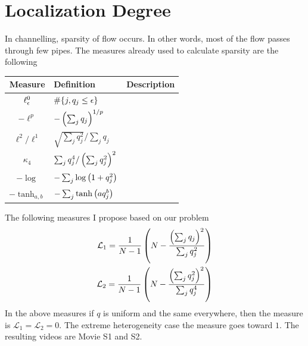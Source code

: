 \newpage

\section{Localization Degree}
%
In channelling, sparsity of flow occurs. In other words, most of the
flow passes through few pipes. The measures already used to calculate
sparsity are the following
%

\begin{center}
  \begin{tabular}{ |c|l|l| }
    \hline
  Measure & Definition & Description  \\ \hline
    $\ell^{0}_{\epsilon}$  & $\#\{j, q_j \leq \epsilon \}$ & \\ \hline
    $-\ell^p$ & $-\left( \sum_j q_j\right)^{1/p}$ & \\ \hline
    $\ell^2/\ell^1$ & $\sqrt{\sum_j q_j^2}/\sum_j q_j$ &\\ \hline
    $\kappa_4$ & $\sum_j q_j^4 / \left( \sum_{j} q^{2}_{j}\right)^2$ & \\ \hline
    $-\log$ & $-\sum_j \log \left( 1 + q_j^2\right) $ & \\ \hline
    $-\tanh_{a,b}$ & $-\sum_j \tanh \left( a q_j^b\right)$ & \\
\hline                               
\end{tabular}
\end{center}


The following measures I propose based on our problem
%
\begin{align}
  \mathcal{L}_1 = \frac{1}{N - 1} \left( N - \frac{\left( \sum_{j} q_j\right) ^2}{\sum_jq^2_j} \right)\\
  \mathcal{L}_2 = \frac{1}{N - 1} \left( N - \frac{\left( \sum_{j} q_j^{2}\right)^2}{{\sum_jq^4_j}} \right)    
\end{align}
%
In the above measures if $q$ is uniform and the same everywhere, then
the measure is $\mathcal{L}_1 = \mathcal{L_2} = 0$. The extreme
heterogeneity case the measure goes toward $1$. The resulting videos
are Movie S1 and S2. 

